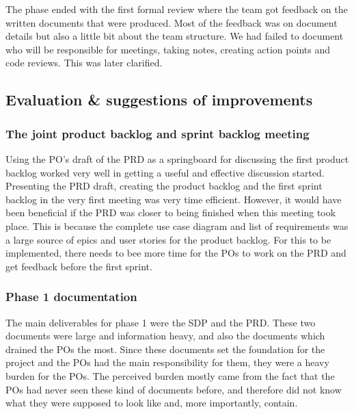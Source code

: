 \documentclass{article}
\begin{document}
The phase ended with the first formal review where the team got feedback on the written documents that were produced. Most of the feedback was on document details but also a little bit about the team structure. We had failed to document who will be responsible for meetings, taking notes, creating action points and code reviews. This was later clarified.

\subsection{Evaluation \& suggestions of improvements }

\subsubsection{The joint product backlog and sprint backlog meeting}
Using the PO's draft of the PRD as a springboard for discussing the first product backlog worked very well in getting a useful and effective discussion started. Presenting the PRD draft, creating the product backlog and the first sprint backlog in the very first meeting was very time efficient. However, it would have been beneficial if the PRD was closer to being finished when this meeting took place. This is because the complete use case diagram and list of requirements was a large source of epics and user stories for the product backlog. For this to be implemented, there needs to bee more time for the POs to work on the PRD and get feedback before the first sprint.

\subsubsection{Phase 1 documentation}\label{POBurden}
The main deliverables for phase 1 were the SDP and the PRD. These two documents were large and information heavy, and also the documents which drained the POs the most. Since these documents set the foundation for the project and the POs had the main responsibility for them, they were a heavy burden for the POs. The perceived burden mostly came from the fact that the POs had never seen these kind of documents before, and therefore did not know what they were supposed to look like and, more importantly, contain. 
\end{document}
